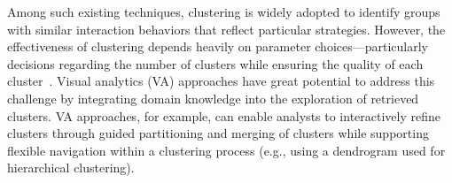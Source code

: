 \documentclass[preprint,journal]{vgtc}            %
\begin{document}
Among such existing techniques, clustering is widely adopted to identify groups with similar interaction behaviors that reflect particular strategies.
However, the effectiveness of clustering depends heavily on parameter choices---particularly decisions regarding the number of clusters while ensuring the quality of each cluster~\cite{Ali19Clustering, Everitt11Cluster,vladimir2002why}.
Visual analytics (VA) approaches have great potential to address this challenge by integrating domain knowledge into the exploration of retrieved clusters.
VA approaches, for example, can enable analysts to interactively refine clusters through guided partitioning and merging of clusters while supporting flexible navigation within a clustering process (e.g., using a dendrogram used for hierarchical clustering).

\end{document}
